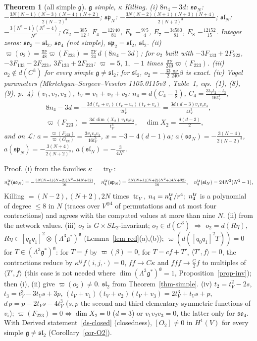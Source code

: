 \documentclass[10pt,a4paper]{article}
\numberwithin{equation}{section}
\newtheorem{theorem}{Theorem}[section]
\theoremstyle{definition}
\theoremstyle{remark}
\newcommand{\tr}{\operatorname{tr}}
\newcommand{\g}{\mathfrak g}
\newcommand{\fsl}{\mathfrak{sl}}
\newcommand{\fso}{\mathfrak{so}}
\newcommand{\fsp}{\mathfrak{sp}}
\begin{document}
\begin{theorem}[all simple $\g$]\label{thm-allsimple}
$\g$ simple, $\kappa$ Killing.
(i) $8n_4-3d$: $\fso_N$: $-\frac{3N(N-1)(N-3)(N-4)(N+2)}{2(N-2)^3}$; $\fsp_N$: $-\frac{3N(N-2)(N+1)(N+3)(N+4)}{2(N+2)^3}$; $\fsl_N$: $-\frac{3(N^2-1)(N^2-4)}{N^2}$; $G_2$ $-\frac{385}{12}$, $F_4$ $-\frac{12740}{81}$, $E_6$ $-\frac{975}4$, $E_7$ $-\frac{34580}{81}$, $E_8$ $-\frac{12152}{15}$. Integer zeros: $\fso_3=\fsl_2$, $\fso_4$ (not simple), $\fsp_2=\fsl_2$, $\fsl_2$.
(ii) $\varpi(o_2)=\frac{\pi\nu}{48}\varpi(F_{223})=\frac{\pi\nu}{24}\,d\,(8n_4-3d)$; for $o_2$ built with $-3F_{133}+2F_{223}$, $-3F_{133}-2F_{223}$, $3F_{133}+2F_{223}$: $\varpi=5,\,1,\,-1$ times $\frac{\pi\nu}{240}\varpi(F_{223})$.
(iii) $o_2\notin d(C^3)$ for every simple $\g\neq\fsl_2$; for $\fsl_2$, $o_2=-\frac{33}2\frac{\pi\nu}{240}\beta$ is exact.
(iv) Vogel parameters (Mkrtchyan--Sergeev--Veselov 1105.0115v3 \cite{MSV}, Table~1, eqs.~(1), (8), (9), p.~4) $(v_1,v_2,v_3)$, $t_V=v_1+v_2+v_3$: $n_4=d(C_4-\frac18)$, $C_4=\frac{3t_Vt_2-t_3}{16t_V^3}$,
\begin{equation}
\begin{gathered}8n_4-3d=-\frac{3d(t_V+v_1)(t_V+v_2)(t_V+v_3)}{2t_V^3}=\frac{3d(d-3)v_1v_2v_3}{4t_V^3},\\ \varpi(F_{223})=\frac{3d\,\dim(X_2)\,v_1v_2v_3}{t_V^3},\quad \dim X_2=\tfrac{d(d-3)}2,\end{gathered}
\end{equation}
and on $\mathcal L$: $a=\frac{\varpi(F_{223})}{\varpi(G_{kk})}=\frac{3v_1v_2v_3}{16t_V^3}$, $x=-3-4(d-1)a$; $a(\fso_N)=-\frac{3(N-4)}{2(N-2)^3}$, $a(\fsp_N)=-\frac{3(N+4)}{2(N+2)^3}$, $a(\fsl_N)=-\frac3{4N^2}$.
\end{theorem}
Proof. (i) from the families $\kappa=\tr_V$:
\begin{equation*}
n_4^{\rm tr}(\fso_N)=-\tfrac{3N(N-1)(N-2)(N^2-14N+32)}{16},\quad n_4^{\rm tr}(\fsp_N)=\tfrac{3N(N+1)(N+2)(N^2+14N+32)}{16},\quad n_4^{\rm tr}(\fsl_N)=24N^2(N^2-1),
\end{equation*}
Killing $=(N-2),(N+2),2N$ times $\tr_V$, $n_4=n_4^{\rm tr}/r^4$; $n_4^{\rm tr}$ is a polynomial of degree $\le8$ in $N$ (traces over $V^{\otimes4}$ of permutations and at most four contractions) and agrees with the computed values at more than nine $N$. (ii) from the network values. (iii) $o_2$ is $G\times SL_2$-invariant; $o_2\in d(C^3)$ $\Rightarrow$ $o_2=d(R\eta)$, $R\eta\in[q_0q_1]^2\otimes(\Lambda^3\g^*)^\g$ (Lemma~\ref{lem-red}(a),(b)); $\varpi(d([q_0q_1]^2T))=0$ for $T\in(\Lambda^3\g^*)^\g$: for $T=f$ by $\varpi(\beta)=0$, for $T=cf+T'$, $\langle T',f\rangle=0$, the contractions reduce by $\kappa^{ij}f(i,j,\cdot)=0$, $ff\to C\kappa$ and $fff\to\frac C2f$ to multiples of $\langle T',f\rangle$ (this case is not needed where $\dim(\Lambda^3\g^*)^\g=1$, Proposition~\ref{prop-inv}); then (i), (ii) give $\varpi(o_2)\ne0$. $\fsl_2$ from Theorem~\ref{thm-simple}. (iv) $t_2=t_V^2-2s$, $t_3=t_V^3-3t_Vs+3p$, $(t_V+v_1)(t_V+v_2)(t_V+v_3)=2t_V^3+t_Vs+p$, $d\,p=p-2t_Vs-4t_V^3$ ($s,p$ the second and third elementary symmetric functions of $v_i$); $\varpi(F_{223})=0\iff\dim X_2=0$ ($d=3$) or $v_1v_2v_3=0$, the latter only for $\fso_4$. With Derived statement~\ref{ds-closed} (closedness), $[O_2]\neq0$ in $H^1(V)$ for every simple $\g\ne\fsl_2$ (Corollary~\ref{cor-O2}).
\end{document}
